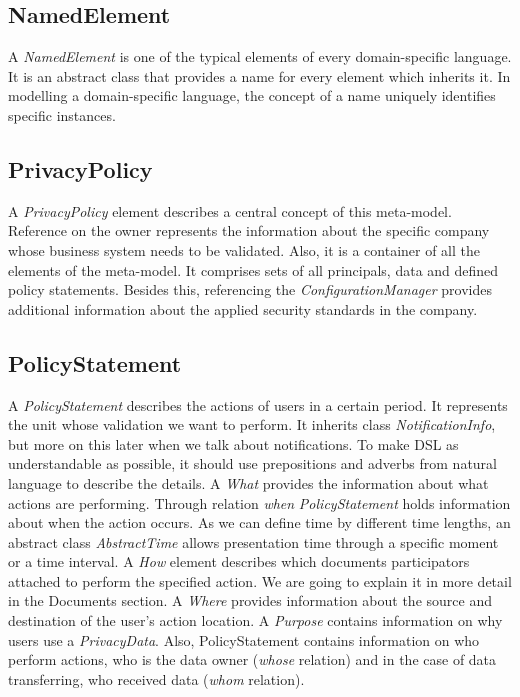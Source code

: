 \documentclass[11pt,english]{article}
\begin{document}
\subsection{NamedElement}
A \emph{NamedElement} is one of the typical elements of every domain-specific language. It is an abstract class that provides a name for every element which inherits it. In modelling a domain-specific language, the concept of a name uniquely identifies specific instances.
\subsection{PrivacyPolicy}
A \emph{PrivacyPolicy} element describes a central concept of this meta-model. Reference on the owner represents the information about the specific company whose business system needs to be validated. Also, it is a container of all the elements of the meta-model. It comprises sets of all principals, data and defined policy statements. Besides this, referencing the \emph{ConfigurationManager} provides additional information about the applied security standards in the company.
\subsection{PolicyStatement}
A \emph{PolicyStatement} describes the actions of users in a certain period. It represents the unit whose validation we want to perform. It inherits class \emph{NotificationInfo}, but more on this later when we talk about notifications. To make DSL as understandable as possible, it should use prepositions and adverbs from natural language to describe the details. A \emph{What} provides the information about what actions are performing. Through relation \emph{when} \emph{PolicyStatement} holds information about when the action occurs. As we can define time by different time lengths, an abstract class \emph{AbstractTime} allows presentation time through a specific moment or a time interval. A \emph{How} element describes which documents participators attached to perform the specified action. We are going to explain it in more detail in the Documents section. A \emph{Where} provides information about the source and destination of the user's action location. A \emph{Purpose} contains information on why users use a \emph{PrivacyData}. Also, PolicyStatement contains information on who perform actions, who is the data owner (\emph{whose} relation) and in the case of data transferring, who received data (\emph{whom} relation).
\end{document}
